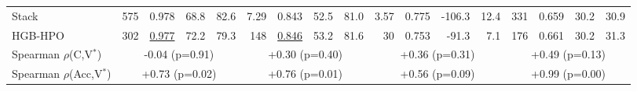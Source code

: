 \begin{table}[t]
\begin{tabular}{lrrrrrrrrrrrrrrrr}
Stack & 575 & 0.978 & 68.8 & 82.6 & 7.29 & 0.843 & 52.5 & 81.0 & 3.57 & 0.775 & -106.3 & 12.4 & 331 & 0.659 & 30.2 & 30.9 \\
HGB-HPO & 302 & \underline{0.977} & 72.2 & 79.3 & 148 & \underline{0.846} & 53.2 & 81.6 & 30 & 0.753 & -91.3 & 7.1 & 176 & 0.661 & 30.2 & 31.3 \\
\midrule
Spearman $\rho$(C,V$^{\ast}$) & \multicolumn{4}{c}{-0.04 (p=0.91)} & \multicolumn{4}{c}{+0.30 (p=0.40)} & \multicolumn{4}{c}{+0.36 (p=0.31)} & \multicolumn{4}{c}{+0.49 (p=0.13)} \\
Spearman $\rho$(Acc,V$^{\ast}$) & \multicolumn{4}{c}{+0.73 (p=0.02)} & \multicolumn{4}{c}{+0.76 (p=0.01)} & \multicolumn{4}{c}{+0.56 (p=0.09)} & \multicolumn{4}{c}{+0.99 (p=0.00)} \\
\bottomrule
\end{tabular}
\end{table}
